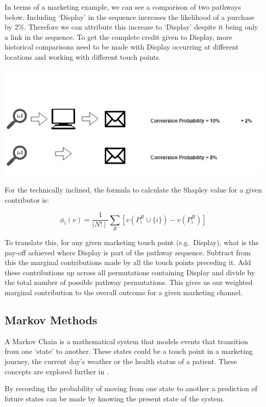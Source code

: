 \documentclass[]{book}
\begin{document}
In terms of a marketing example, we can see a comparison of two pathways below.
Including `Display' in the sequence increases the likelihood of a purchase by 2\%.
Therefore we can attribute this increase to `Display' despite it being only a
link in the sequence. To get the complete credit given to Display, more historical
comparisons need to be made with Display occurring at different locations and
working with different touch points.

\includegraphics[width=6.28in]{img/shapley}

For the technically inclined, the formula to calculate the Shapley value for a given contributor is:

\[
\phi_i(v) = \frac{1}{\mid{N!}\mid}\sum_{R}[v(P_i^R \cup \{i\}) - v(P_i^R)]
\]

To translate this, for any given marketing touch point (e.g.~Display), what is
the pay-off achieved where Display is part of the pathway sequence. Subtract from
this the marginal contributions made by all the touch points preceding it. Add
these contributions up across all permutations containing Display and divide by
the total number of possible pathway permutations. This gives us our weighted
marginal contribution to the overall outcome for a given marketing channel.

\hypertarget{markov-methods}{%
\subsection{Markov Methods}\label{markov-methods}}

A Markov Chain is a mathematical system that models events that
transition from one `state' to another. These states could be a touch point in
a marketing journey, the current day's weather or the health status of a patient.
These concepts are explored further in \citep{gagniuc2017markov}.

By recording the probability of moving from one state to another a prediction
of future states can be made by knowing the present state of the system.
\end{document}
